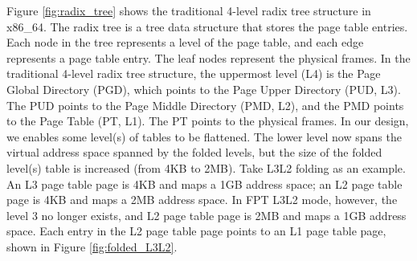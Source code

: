Figure \ref{fig:radix_tree} shows the traditional 4-level radix tree structure in x86\_64. The radix tree is a tree data structure that stores the page table entries. Each node in the tree represents a level of the page table, and each edge represents a page table entry. The leaf nodes represent the physical frames. In the traditional 4-level radix tree structure, the uppermost level (L4) is the Page Global Directory (PGD), which points to the Page Upper Directory (PUD, L3). The PUD points to the Page Middle Directory (PMD, L2), and the PMD points to the Page Table (PT, L1). The PT points to the physical frames. In our design, we enables some level(s) of tables to be flattened. The lower level now spans the virtual address space spanned by the folded levels, but the size of the folded level(s) table is increased (from 4KB to 2MB). Take L3L2 folding as an example. An L3 page table page is 4KB and maps a 1GB address space; an L2 page table page is 4KB and maps a 2MB address space. In FPT L3L2 mode, however, the level 3 no longer exists, and L2 page table page is 2MB and maps a 1GB address space. Each entry in the L2 page table page points to an L1 page table page, shown in Figure \ref{fig:folded_L3L2}.
